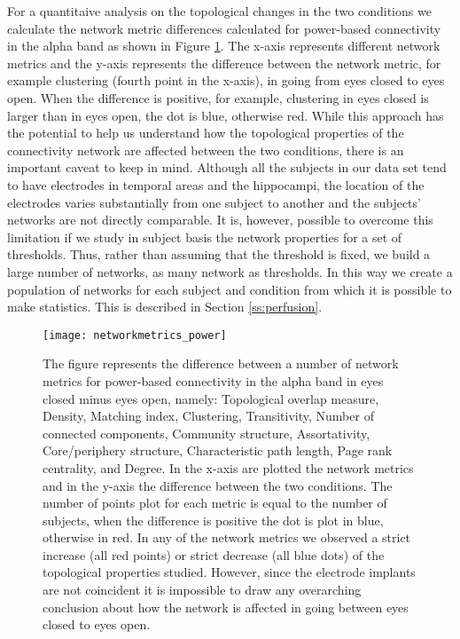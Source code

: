 \documentclass[11pt, onecolumn]{article}
\begin{document}
For a quantitaive analysis on the topological changes in the two conditions we calculate the network metric differences calculated for power-based connectivity in the alpha band as shown in Figure \ref{fig:networkmetrics_power}. The x-axis represents different network metrics and the y-axis represents the difference between the network metric, for example clustering (fourth point in the x-axis), in going from eyes closed to eyes open. When the difference is positive, for example, clustering in eyes closed is larger than in eyes open, the dot is blue, otherwise red. While this approach has the potential to help us understand how the topological properties of the connectivity network are affected between the two conditions, there is an important caveat to keep in mind.
Although all the subjects in our data set tend to have electrodes in temporal areas and the hippocampi, the location of the electrodes varies substantially from one subject to another and the subjects’ networks are not directly comparable. 
It is, however, possible to overcome this limitation if we study in subject basis the network properties for a set of thresholds. Thus, rather than assuming that the threshold is fixed, we build a large number of networks,  as many network as thresholds. In this way we create a population of networks for each subject and condition from which it is possible to make statistics. This is described in Section  \ref{ss:perfusion}.

\begin{figure}[H]
        \centering
        \texttt{[image: networkmetrics\_power]}
        \caption{The figure represents the difference between a number of network metrics for power-based connectivity in the alpha band in eyes closed minus eyes open, namely: Topological overlap measure, Density, Matching index, Clustering, Transitivity, Number of connected components, Community structure, Assortativity, Core/periphery structure, Characteristic path length, Page rank centrality, and Degree. In the x-axis are plotted the network metrics and in the y-axis the difference between the two conditions. The number of points plot for each metric is equal to the number of subjects, when the difference is positive the dot is plot in blue, otherwise in red. In any of the network metrics we observed a strict increase (all red points) or strict decrease (all blue dots) of the topological properties studied. However, since the electrode implants are not coincident it is impossible to draw any overarching conclusion about how the network is affected in going between eyes closed to eyes open.  }
\label{fig:networkmetrics_power}
\end{figure}
\end{document}
